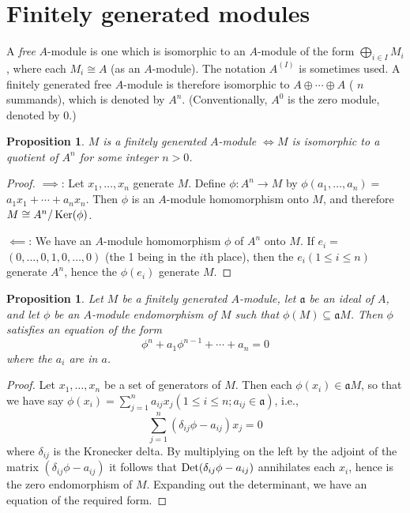 \documentclass{standalone}
\newtheorem{proposition}[theorem]{Proposition}
\theoremstyle{definition}
\theoremstyle{remark}
\begin{document}
\section{Finitely generated modules}
A \textit{free} $A$-module is one which is isomorphic to an $A$-module of the form
$\bigoplus_{i \in I} M_{i}$, where each $M_{i} \cong A$ (as an $A$-module). The
notation $A^{(I)}$ is sometimes used. A finitely generated free $A$-module is
therefore isomorphic to $A \oplus \cdots \oplus A$ ( $n$ summands), which is
denoted by $A^{n}$. (Conventionally, $A^{0}$ is the zero module, denoted by 0.)
\begin{proposition}\label{prop:2.3}
  $M$ is a finitely generated $A$-module $\iff M$ is
isomorphic to a quotient of $A^{n}$ for some integer $n>0$.
\end{proposition}
\begin{proof}
  $\implies$: Let $x_{1}, \ldots, x_{n}$ generate $M$. Define
$\phi: A^{n} \to M$ by $\phi(a_{1}, \ldots, a_{n})=$
$a_{1} x_{1}+\cdots+a_{n} x_{n}$. Then $\phi$ is an $A$-module homomorphism onto
$M$, and therefore $M \cong A^{n} / \operatorname{Ker}(\phi)$.

$\impliedby$: We have an $A$-module homomorphism $\phi$ of $A^{n}$ onto $M$. If
$e_{i}=$ $(0, \ldots, 0,1,0, \ldots, 0)$ (the 1 being in the $i$th place), then
the $e_{i}(1 \leq i \leq n)$ generate $A^{n}$, hence the
$\phi(e_{i})$ generate $M$.
\end{proof}
\begin{proposition}\label{prop:2.4}
Let $M$ be a finitely generated $A$-module, let $\mathfrak{a}$ be an ideal
of $A$, and let $\phi$ be an $A$-module endomorphism of $M$ such that
$\phi(M) \subseteq \mathfrak{a} M$. Then $\phi$ satisfies an equation of the
form
\[
  \phi^{n}+a_{1} \phi^{n-1}+\cdots+a_{n}=0
\]
where the $a_{i}$ are in $a$.
\end{proposition}
\begin{proof}
Let $x_{1}, \ldots, x_{n}$ be a set of generators of $M$. Then each
$\phi(x_{i}) \in \mathfrak{a} M$, so that we have say
$\phi(x_{i})=\sum_{j=1}^{n} a_{i j} x_{j}(1 \le i \le n ; a_{i j} \in \mathfrak{a})$,
i.e.,
\[
  \sum_{j=1}^{n}(\delta_{i j} \phi-a_{i j}) x_{j}=0
\]
where $\delta_{i j}$ is the Kronecker delta. By multiplying on the left by the
adjoint of the matrix $(\delta_{i j} \phi-a_{i j})$ it follows that
$\operatorname{Det}(\delta_{i j} \phi-a_{i j})$ annihilates each $x_{i}$, hence is
the zero endomorphism of $M$. Expanding out the determinant, we have an equation
of the required form.
\end{proof}
\end{document}
